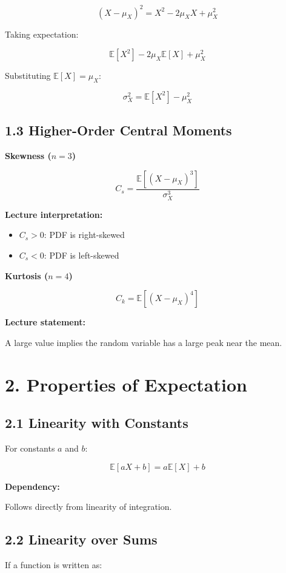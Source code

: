 \documentclass[12pt]{article}
\begin{document}
\[
(X - \mu_X)^2 = X^2 - 2\mu_X X + \mu_X^2
\]

Taking expectation:

\[
\mathbb{E}[X^2] - 2\mu_X \mathbb{E}[X] + \mu_X^2
\]

Substituting $\mathbb{E}[X] = \mu_X$:

\[
\sigma_X^2 = \mathbb{E}[X^2] - \mu_X^2
\]

\subsection*{1.3 Higher-Order Central Moments}

\textbf{Skewness ($n=3$)}

\[
C_s = \frac{\mathbb{E}\left[(X - \mu_X)^3\right]}{\sigma_X^3}
\]

\textbf{Lecture interpretation:}
\begin{itemize}
\item $C_s > 0$: PDF is right-skewed
\item $C_s < 0$: PDF is left-skewed
\end{itemize}

\textbf{Kurtosis ($n=4$)}

\[
C_k = \mathbb{E}\left[(X - \mu_X)^4\right]
\]

\textbf{Lecture statement:}

A large value implies the random variable has a large peak near the mean.

\section*{2. Properties of Expectation}

\subsection*{2.1 Linearity with Constants}

For constants $a$ and $b$:

\[
\mathbb{E}[aX + b] = a\mathbb{E}[X] + b
\]

\textbf{Dependency:}

Follows directly from linearity of integration.

\subsection*{2.2 Linearity over Sums}

If a function is written as:
\end{document}
